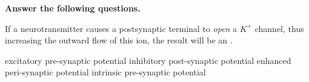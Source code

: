 \documentclass[answers]{exam}
\begin{document}
\begin{questions}
\newpage

\textbf{Answer the following questions.}







\question If a neurotransmitter causes a postsynaptic terminal to \emph{open} a $K^+$ channel, thus increasing the outward flow of this ion, the result will be an \fillin.
\begin{choices}
\choice excitatory pre-synaptic potential
\correctchoice inhibitory post-synaptic potential
\choice enhanced peri-synaptic potential
\choice intrinsic pre-synaptic potential
\end{choices}


\end{questions}
\end{document}
